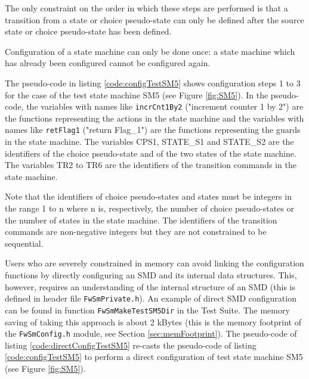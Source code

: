 \documentclass[manual]{../fwprofile}
\begin{document}
The only constraint on the order in which these steps are performed is that a transition from a state or 
choice pseudo-state can only be defined after the source state or choice pseudo-state has been defined. 

Configuration of a state machine can only be done once: a state machine which has already been configured 
cannot be configured again.

The pseudo-code in listing \ref{code:configTestSM5} shows configuration steps 1 to 3 for the case of the test state machine SM5 
(see Figure \ref{fig:SM5}). In the pseudo-code, the variables with names like \texttt{incrCnt1By2} ("increment 
counter 1 by 2") are the functions representing the actions in the state machine and the variables with names 
like \texttt{retFlag1} ("return Flag\_1") are the functions representing the guards in the state machine.
The variables CPS1, STATE\_S1 and STATE\_S2 are the identifiers of the choice pseudo-state and of the two
states of the state machine. The variables TR2 to TR6 are the identifiers of the transition commands in the state 
machine.

Note that the identifiers of choice pseudo-states and states must be integers in the range 1 to n where n is,
respectively, the number of choice pseudo-states or the number of states in the state machine. 
The identifiers of the transition commands are non-negative integers but they are not constrained to
be sequential.

Users who are severely constrained in memory can avoid linking the configuration functions by directly 
configuring an SMD and its internal data structures. This, however, requires an understanding of the internal 
structure of an SMD (this is defined in header file \texttt{FwSmPrivate.h}). An example of direct SMD 
configuration can be found in function \texttt{FwSmMakeTestSM5Dir} in the Test Suite. The memory saving of 
taking this approach is about 2 kBytes (this is the memory footprint of the \texttt{FwSmConfig.h} module, 
see Section \ref{sec:memFootprint}). The pseudo-code of listing \ref{code:directConfigTestSM5}
re-casts the pseudo-code of listing \ref{code:configTestSM5} to perform a direct configuration of test 
state machine SM5 (see Figure \ref{fig:SM5}). 
\end{document}
